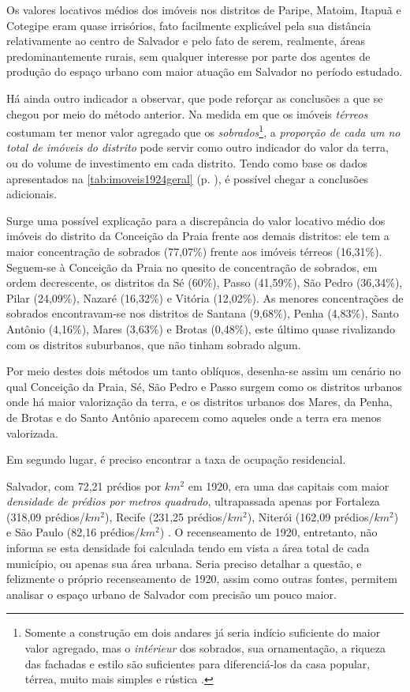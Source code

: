 Os valores locativos médios dos imóveis nos distritos de Paripe, Matoim, Itapuã e Cotegipe eram quase irrisórios, fato facilmente explicável pela sua distância relativamente ao centro de Salvador e pelo fato de serem, realmente, áreas predominantemente rurais, sem qualquer interesse por parte dos agentes de produção do espaço urbano com maior atuação em Salvador no período estudado.

Há ainda outro indicador a observar, que pode reforçar as conclusões a que se chegou por meio do método anterior. Na medida em que os imóveis \textit{térreos} costumam ter menor valor agregado que os \textit{sobrados}\footnote{Somente a construção em dois andares já seria indício suficiente do maior valor agregado, mas o \textit{intérieur} dos sobrados, sua ornamentação, a riqueza das fachadas e estilo são suficientes para diferenciá-los da casa popular, térrea, muito mais simples e rústica \cite[pp.~87-111]{ott_formaet1_1955}.}, a \textit{proporção de cada um no total de imóveis do distrito} pode servir como outro indicador do valor da terra, ou do volume de investimento em cada distrito. Tendo como base os dados apresentados na \autoref{tab:imoveis1924geral} (p. \pageref{tab:imoveis1924geral}), é possível chegar a conclusões adicionais.

Surge uma possível explicação para a discrepância do valor locativo médio dos imóveis do distrito da Conceição da Praia frente aos demais distritos: ele tem a maior concentração de sobrados (77,07\%) frente aos imóveis térreos (16,31\%). Seguem-se à Conceição da Praia no quesito de concentração de sobrados, em ordem decrescente, os distritos da Sé (60\%), Passo (41,59\%), São Pedro (36,34\%), Pilar (24,09\%), Nazaré (16,32\%) e Vitória (12,02\%). As menores concentrações de sobrados encontravam-se nos distritos de Santana (9,68\%), Penha (4,83\%), Santo Antônio (4,16\%), Mares (3,63\%) e Brotas (0,48\%), este último quase rivalizando com os distritos suburbanos, que não tinham sobrado algum.

Por meio destes dois métodos um tanto oblíquos, desenha-se assim um cenário no qual Conceição da Praia, Sé, São Pedro e Passo surgem como os distritos urbanos onde há maior valorização da terra, e os distritos urbanos dos Mares, da Penha, de Brotas e do Santo Antônio aparecem como aqueles onde a terra era menos valorizada.

Em segundo lugar, é preciso encontrar a taxa de ocupação residencial.

Salvador, com 72,21 prédios por $km^{2}$ em 1920, era uma das capitais com maior \textit{densidade de prédios por metros quadrado}, ultrapassada apenas por Fortaleza (318,09 prédios/$km^{2}$), Recife (231,25 prédios/$km^{2}$), Niterói (162,09 prédios/$km^{2}$) e São Paulo (82,16 prédios/$km^{2}$) \cite[p.~XV]{brasil_censo46_1920}. O recenseamento de 1920, entretanto, não informa se esta densidade foi calculada tendo em vista a área total de cada município, ou apenas sua área urbana. Seria preciso detalhar a questão, e felizmente o próprio recenseamento de 1920, assim como outras fontes, permitem analisar o espaço urbano de Salvador com precisão um pouco maior.

